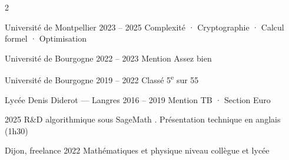 \documentclass[10pt,a4paper,ragged2e,withhyper]{altacv}
\begin{document}
\begin{paracol}{2}

\switchcolumn

\makecvheaderleft



         {Université de Montpellier}
         {2023 – 2025}
         {Complexité · Cryptographie · Calcul formel · Optimisation}

\vspace{0.7em}

         {Université de Bourgogne}
         {2022 – 2023}
         {Mention Assez bien}

\vspace{0.7em}

         {Université de Bourgogne}
         {2019 – 2022}
         {Classé 5\textsuperscript{e} sur 55}

\vspace{0.9em}

         {Lycée Denis Diderot — Langres}
         {2016 – 2019}
         {Mention TB · Section Euro} %



         {2025}
         {R\&D algorithmique sous SageMath . Présentation technique en anglais (1h30)}

\vspace{0.9em}

         {Dijon, freelance}
         {2022}
         {Mathématiques et physique niveau collègue et lycée}


\end{paracol}
\end{document}
